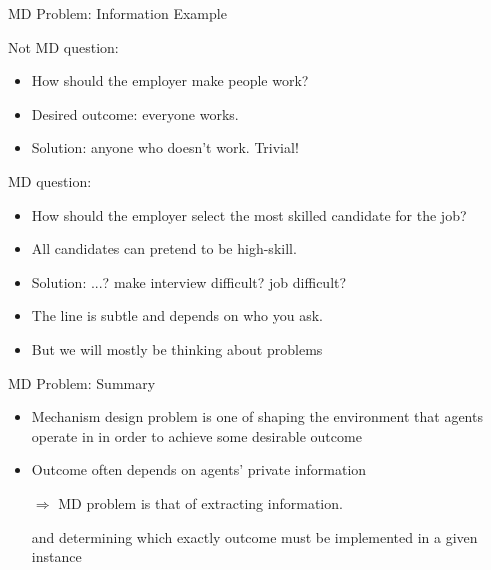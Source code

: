 \documentclass[english,10pt
,aspectratio=169
]{beamer}
\begin{document}
\begin{frame}{MD Problem: Information Example}
\begin{exampleblock}{Not MD question:}
	\begin{itemize}
		\item How should the employer \alert<1>{make people work}?
		\item Desired outcome: everyone works.
		\item Solution:  anyone who doesn't work. Trivial!
	\end{itemize}
\end{exampleblock}
\pause
\begin{exampleblock}{MD question:}
	\begin{itemize}
		\item How should the employer \alert<2>{select the most skilled candidate for the job}?
		\item All candidates can pretend to be high-skill.
		\item Solution: ...? make interview difficult? job difficult?
	\end{itemize}
\end{exampleblock}
\pause
\begin{itemize}
	\item The line is subtle and depends on who you ask.
	\item But we will mostly be thinking about  problems
\end{itemize}
\end{frame}


\begin{frame}{MD Problem: Summary}
\begin{itemize}
	\item Mechanism design problem is one of shaping the environment that agents operate in in order to achieve some desirable outcome
	\item Outcome often depends on agents' private information 
	
	$\Rightarrow$ MD problem is that of extracting information.
	
	and determining which exactly outcome must be implemented in a given instance
\end{itemize}
\end{frame}
\end{document}
